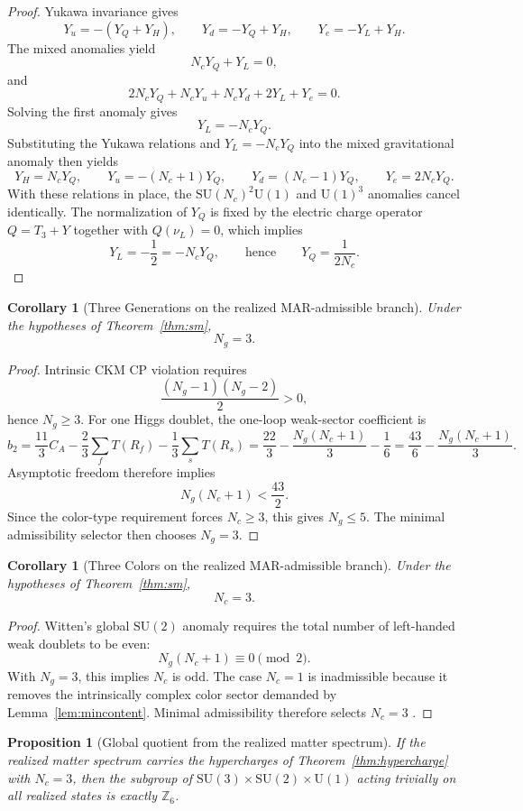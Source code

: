 \documentclass[11pt]{article}
\newtheorem{corollary}[theorem]{Corollary}
\newtheorem{proposition}[theorem]{Proposition}
\newcommand{\SU}{\mathrm{SU}}
\newcommand{\U}{\mathrm{U}}
\begin{document}
\begin{proof}
Yukawa invariance gives
\[
Y_u=-(Y_Q+Y_H),\qquad
Y_d=-Y_Q+Y_H,\qquad
Y_e=-Y_L+Y_H.
\]
The mixed anomalies yield
\[
N_cY_Q+Y_L=0,
\]
and
\[
2N_cY_Q+N_cY_u+N_cY_d+2Y_L+Y_e=0.
\]
Solving the first anomaly gives
\[
Y_L=-N_cY_Q.
\]
Substituting the Yukawa relations and $Y_L=-N_cY_Q$ into the mixed gravitational anomaly then yields
\[
Y_H=N_cY_Q,\qquad
Y_u=-(N_c+1)Y_Q,\qquad
Y_d=(N_c-1)Y_Q,\qquad
Y_e=2N_cY_Q.
\]
With these relations in place, the $\SU(N_c)^2\U(1)$ and $\U(1)^3$ anomalies cancel identically. The normalization of $Y_Q$ is fixed by the electric charge operator $Q=T_3+Y$ together with $Q(\nu_L)=0$, which implies
\[
Y_L=-\frac12=-N_cY_Q,
\qquad\text{hence}\qquad
Y_Q=\frac{1}{2N_c}.
\]
\end{proof}

\begin{corollary}[Three Generations on the realized MAR-admissible branch]\label{cor:ng}
Under the hypotheses of Theorem~\ref{thm:sm},
\[
N_g=3.
\]
\end{corollary}

\begin{proof}
Intrinsic CKM CP violation requires
\[
\frac{(N_g-1)(N_g-2)}{2}>0,
\]
hence $N_g\ge 3$. For one Higgs doublet, the one-loop weak-sector coefficient is
\[
b_2=\frac{11}{3}C_A-\frac{2}{3}\sum_f T(R_f)-\frac{1}{3}\sum_s T(R_s)
=
\frac{22}{3}-\frac{N_g(N_c+1)}{3}-\frac16
=
\frac{43}{6}-\frac{N_g(N_c+1)}{3}.
\]
Asymptotic freedom therefore implies
\[
N_g(N_c+1)<\frac{43}{2}.
\]
Since the color-type requirement forces $N_c\ge 3$, this gives $N_g\le 5$. The minimal admissibility selector then chooses $N_g=3$.
\end{proof}

\begin{corollary}[Three Colors on the realized MAR-admissible branch]\label{cor:nc}
Under the hypotheses of Theorem~\ref{thm:sm},
\[
N_c=3.
\]
\end{corollary}

\begin{proof}
Witten's global $\SU(2)$ anomaly requires the total number of left-handed weak doublets to be even:
\[
N_g(N_c+1)\equiv 0 \pmod 2.
\]
With $N_g=3$, this implies $N_c$ is odd. The case $N_c=1$ is inadmissible because it removes the intrinsically complex color sector demanded by Lemma~\ref{lem:mincontent}. Minimal admissibility therefore selects $N_c=3$ \cite{Witten82}.
\end{proof}

\begin{proposition}[Global quotient from the realized matter spectrum]\label{prop:z6}
If the realized matter spectrum carries the hypercharges of Theorem~\ref{thm:hypercharge} with $N_c=3$, then the subgroup of $\SU(3)\times\SU(2)\times\U(1)$ acting trivially on all realized states is exactly $\mathbb Z_6$.
\end{proposition}
\end{document}
